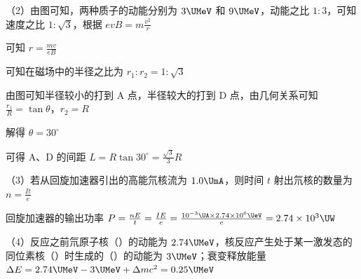 \documentclass[\gkver]{gaokaozhenti}
\begin{document}
\begin{enumerate}
{（2）由图可知，两种质子的动能分别为 $3\UMeV$ 和 $9\UMeV$，动能之比 $1:3$，可知速度之比 $1:\sqrt{3}$，根据 $evB = m\frac{v^{2}}{r}$

可知 $r = \frac{mv}{eB}$

可知在磁场中的半径之比为 $r_{1}:r_{2} = 1:\sqrt{3}$

由图可知半径较小的打到 A 点，半径较大的打到 D 点，由几何关系可知 $\frac{r_{1}}{R} = \tan\theta$，$r_{2} = R$

解得 $\theta = 30^{\circ}$

可得 A、D 的间距 $L = R\tan 30^{\circ} = \frac{\sqrt{3}}{3}R$


（3）若从回旋加速器引出的高能氘核流为 $1.0\UmA$，则时间 $t$ 射出氘核的数量为 $n = \frac{It}{e}$

回旋加速器的输出功率 $P = \frac{nE}{t} = \frac{IE}{e} = \frac{10^{-3}\UA \times 2.74 \times 10^{6}\UeV}{e} = 2.74 \times 10^{3}\UW$

（4）反应之前氘原子核（）的动能为 $2.74\UMeV$，核反应产生处于某一激发态的同位素核（）时生成的（）的动能为 $3\UMeV$；衰变释放能量 $\Delta E = 2.74\UMeV - 3\UMeV + \Delta mc^{2} = 0.25\UMeV$
}

\end{enumerate}
\end{document}
